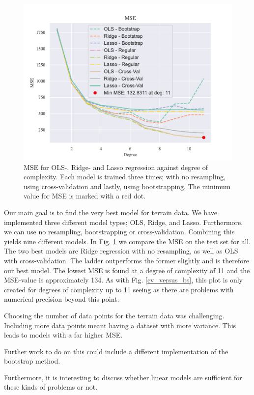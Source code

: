\begin{figure}[h!]
    \centering
    \includegraphics[width=1\linewidth]{project_1/figures/figures_in_report/All_Terrain.pdf}
    \caption{MSE for OLS-, Ridge- and Lasso regression against degree of complexity. Each model is trained three times; with no resampling, using cross-validation and lastly, using bootstrapping. The minimum value for MSE is marked with a red dot.}
    \label{all_terrain}
\end{figure}

Our main goal is to find the very best model for terrain data. We have implemented three different model types; OLS, Ridge, and Lasso. Furthermore, we can use no resampling, bootstrapping or cross-validation. Combining this yields nine different models. In Fig. \ref{all_terrain} we compare the MSE on the test set for all. The two best models are Ridge regression with no resampling, as well as OLS with cross-validation. The ladder outperforms the former slightly and is therefore our best model. The lowest MSE is found at a degree of complexity of 11 and the MSE-value is approximately 134. As with Fig. \ref{cv_versus_bs}, this plot is only created for degrees of complexity up to 11 seeing as there are problems with numerical precision beyond this point. 


Choosing the number of data points for the terrain data was challenging. Including more data points meant having a dataset with more variance. This leads to models with a far higher MSE. 

Further work to do on this could include a different implementation of the bootstrap method.

Furthermore, it is interesting to discuss whether linear models are sufficient for these kinds of problems or not. 

